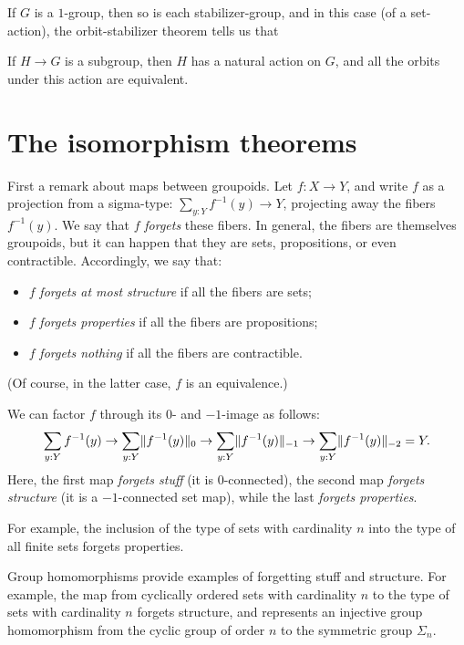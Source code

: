 If $G$ is a $1$-group,
then so is each stabilizer-group,
and in this case (of a set-action),
the orbit-stabilizer theorem
tells us that 

\begin{theorem}
  If $H \to G$ is a subgroup, then $H$ has a natural action on $G$,
  and all the orbits under this action are equivalent.
\end{theorem}


\section{The isomorphism theorems}
\label{sec:noether-theorems}

First a remark about maps between groupoids.
Let $f : X \to Y$, and write $f$ as a projection from a sigma-type:
$\sum_{y:Y} f^{-1}(y) \to Y$,
projecting away the fibers $f^{-1}(y)$.
We say that $f$ \emph{forgets} these fibers.
In general, the fibers are themselves groupoids,
but it can happen that they are sets, propositions, or even contractible.
Accordingly, we say that:
\begin{itemize}
\item $f$ \emph{forgets at most structure} if all the fibers are sets;
\item $f$ \emph{forgets properties} if all the fibers are propositions;
\item $f$ \emph{forgets nothing} if all the fibers are contractible.
\end{itemize}
(Of course, in the latter case, $f$ is an equivalence.)

We can factor $f$ through its $0$- and $-1$-image as follows:
\[
  \sum_{y:Y} f^{-1}(y) \to
  \sum_{y:Y} \lVert f^{-1}(y)\rVert_0 \to
  \sum_{y:Y} \lVert f^{-1}(y)\rVert_{-1} \to
  \sum_{y:Y} \lVert f^{-1}(y)\rVert_{-2} = Y.
\]
Here, the first map \emph{forgets stuff} (it is $0$-connected),
the second map \emph{forgets structure} (it is a $-1$-connected set map),
while the last \emph{forgets properties}.

For example, the inclusion of the type of sets with cardinality
$n$ into the type of all finite sets
forgets properties.

Group homomorphisms provide examples of forgetting stuff and structure.
For example, the map from cyclically ordered sets with cardinality $n$
to the type of sets with cardinality $n$ forgets structure,
and represents an injective group homomorphism from the cyclic
group of order $n$ to the symmetric group $\Sigma_n$.

